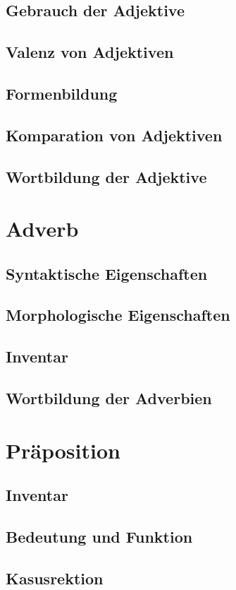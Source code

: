\documentclass{report}
\begin{document}
		\subsection{Gebrauch der Adjektive}
		\subsection{Valenz von Adjektiven}
		\subsection{Formenbildung}
		\subsection{Komparation von Adjektiven}
		\subsection{Wortbildung der Adjektive}
	\section{Adverb}
		\subsection{Syntaktische Eigenschaften}
		\subsection{Morphologische Eigenschaften}
		\subsection{Inventar}
		\subsection{Wortbildung der Adverbien}
	\section{Präposition}
		\subsection{Inventar}
		\subsection{Bedeutung und Funktion}
		\subsection{Kasusrektion}
\end{document}
